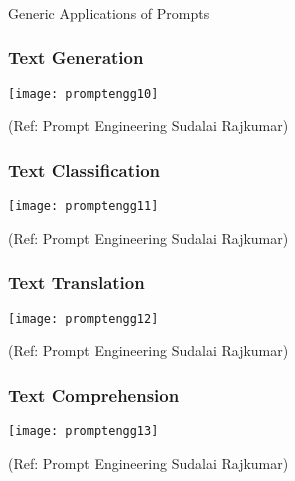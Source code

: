 
\begin{frame}[fragile]\frametitle{}
\begin{center}
{\Large Generic Applications of Prompts}
\end{center}
\end{frame}

\begin{frame}[fragile]\frametitle{Text Generation}

\begin{center}
\texttt{[image: promptengg10]}

{\tiny (Ref: Prompt Engineering Sudalai Rajkumar)}

\end{center}		
		


\end{frame}

\begin{frame}[fragile]\frametitle{Text Classification}

\begin{center}
\texttt{[image: promptengg11]}

{\tiny (Ref: Prompt Engineering Sudalai Rajkumar)}

\end{center}		
		


\end{frame}

\begin{frame}[fragile]\frametitle{Text Translation}

\begin{center}
\texttt{[image: promptengg12]}

{\tiny (Ref: Prompt Engineering Sudalai Rajkumar)}

\end{center}		
		


\end{frame}

\begin{frame}[fragile]\frametitle{Text Comprehension}

\begin{center}
\texttt{[image: promptengg13]}

{\tiny (Ref: Prompt Engineering Sudalai Rajkumar)}

\end{center}		
		


\end{frame}

